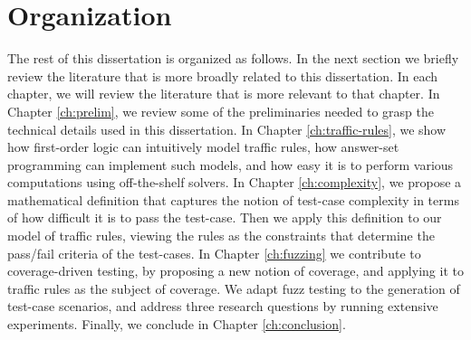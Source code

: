 \section{Organization}

The rest of this dissertation is organized as follows.
%
In the next section we briefly review the literature that is more broadly related to this dissertation.
%
In each chapter, we will review the literature that is more relevant to that chapter.
%
In Chapter \ref{ch:prelim}, we review some of the preliminaries needed to grasp the technical details used in this dissertation.
%
In Chapter \ref{ch:traffic-rules}, we show how first-order logic can intuitively model traffic rules, how answer-set programming can implement such models, and how easy it is to perform various computations using off-the-shelf solvers.
%
In Chapter \ref{ch:complexity}, we propose a mathematical definition that captures the notion of test-case complexity in terms of how difficult it is to pass the test-case.
%
Then we apply this definition to our model of traffic rules, viewing the rules as the constraints that determine the pass/fail criteria of the test-cases.
%
In Chapter \ref{ch:fuzzing} we contribute to coverage-driven testing, by proposing a new notion of coverage, and applying it to traffic rules as the subject of coverage.
%
We adapt fuzz testing to the generation of test-case scenarios, and address three research questions by running extensive experiments.
%
Finally, we conclude in Chapter \ref{ch:conclusion}.